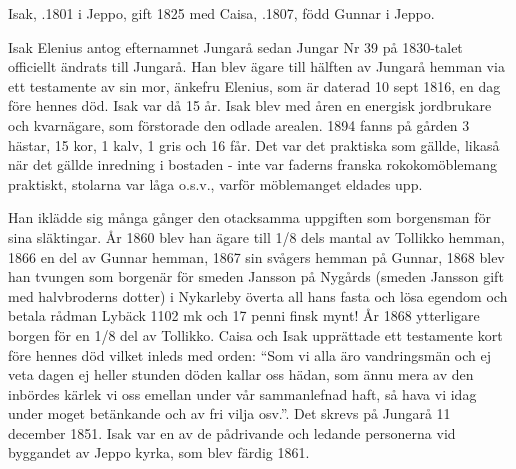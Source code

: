 Isak, .1801 i Jeppo, gift 1825 med Caisa, .1807, född Gunnar i Jeppo.
\begin{jhchildren}
  \item {}
  \item {}
  \item {}
  \item {}
  \item {}
  \item {}
  \item {}
  \item {}
  \item {}
\end{jhchildren}
Isak Elenius antog efternamnet Jungarå sedan Jungar Nr 39 på 1830-talet officiellt ändrats till Jungarå. Han blev ägare till hälften av Jungarå hemman via ett testamente av sin mor, änkefru Elenius, som är daterad 10 sept 1816, en dag före hennes död. Isak var då 15 år. Isak blev med åren en energisk jordbrukare och kvarnägare, som förstorade den odlade arealen. 1894 fanns på gården 3 hästar, 15 kor, 1 kalv, 1 gris och 16 får. Det var det praktiska som gällde, likaså när det gällde inredning i bostaden - inte var faderns franska rokokomöblemang praktiskt, stolarna var låga o.s.v., varför möblemanget eldades upp.

Han iklädde sig många gånger den otacksamma uppgiften som borgensman för sina släktingar. År 1860 blev han ägare till 1/8 dels mantal av Tollikko hemman, 1866 en del av Gunnar hemman, 1867 sin svågers hemman på Gunnar, 1868 blev han tvungen 	som borgenär för smeden Jansson på 	Nygårds (smeden Jansson gift med halvbroderns dotter) i Nykarleby överta all hans 	fasta och lösa egendom och betala rådman Lybäck 1102 mk och 17 penni finsk mynt!	År 1868 ytterligare borgen för en 1/8 del av Tollikko. Caisa och Isak upprättade ett testamente kort före hennes död vilket inleds med orden: 	``Som vi alla äro vandringsmän och ej veta dagen ej heller stunden döden kallar oss hädan, som ännu mera av den inbördes kärlek vi oss emellan under vår sammanlefnad haft, så hava vi idag under moget betänkande och av fri vilja osv.''. Det skrevs på 	Jungarå 11 december 1851. Isak var en av de pådrivande och ledande personerna vid byggandet av Jeppo kyrka, som blev 	färdig 1861.

